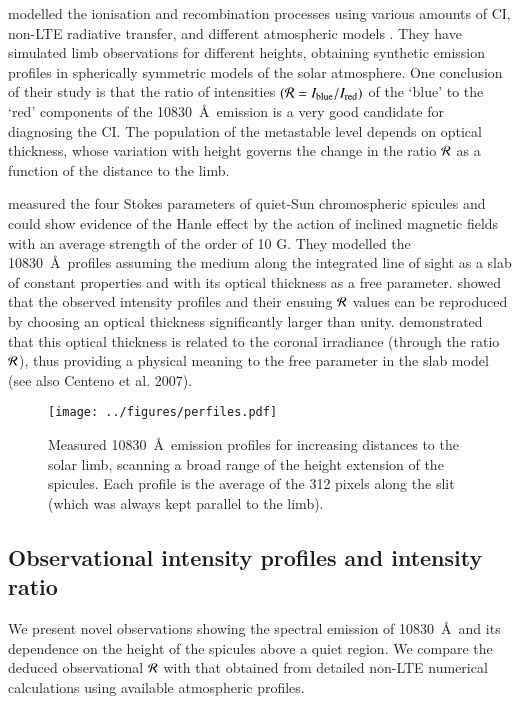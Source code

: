 \citet{Centeno06} modelled the ionisation and recombination processes using various   
 amounts of CI, non-LTE radiative transfer, and different atmospheric
 models {  \citep[see also][]{cente07}}.
 They have simulated limb observations for different heights, obtaining
 synthetic emission profiles in spherically symmetric models of the solar atmosphere. One conclusion of their  study is that the ratio of intensities $({\cal R}=I_{\rm blue}/I_{\rm red})$ of the `blue' to the `red' components of the  10830~\AA\ emission
 is a very good candidate for diagnosing the CI. The population of the metastable level depends on optical thickness, whose variation with height governs the change in the ratio $\cal R$ as a function of the distance to the limb.
 
\citet{truj05} measured the four Stokes parameters of quiet-Sun chromospheric spicules and could show evidence of the Hanle effect by the action of inclined magnetic fields with an average strength of the order of 10 G. They modelled the  10830~\AA\
profiles assuming the medium along the integrated line of sight as a slab of constant properties and with its optical thickness as a free parameter. \citet{truj05} showed that the observed intensity profiles and their ensuing $\cal R$ values can be reproduced by choosing an optical thickness significantly larger than unity. \citet{Centeno06} demonstrated that this optical thickness is related to the coronal irradiance (through the ratio $\cal R$), thus providing a physical meaning to the free parameter in the slab model (see also Centeno et al. 2007).
\begin{figure}[t]
\center \texttt{[image: ../figures/perfiles.pdf]} 
\caption{Measured  10830~\AA\ emission profiles for increasing
  distances to the solar limb, scanning a broad range of the height extension of the 
  spicules. Each profile is the average of the 312 pixels along the slit (which was always kept parallel to the limb).}  
\label{fig:spe}
\end{figure}

\subsection{Observational  %
 intensity profiles and intensity ratio}

We present novel observations showing the spectral emission of  10830~\AA\ and its dependence on the height of the
spicules above a quiet region. We compare the deduced observational $\cal R$ with that obtained from detailed non-LTE numerical calculations using available atmospheric profiles. 

